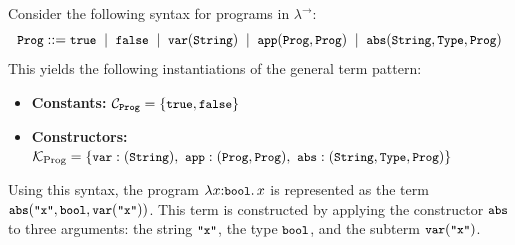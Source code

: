 \documentclass[manuscript,screen]{acmart}
\newcommand{\tcode}[1]{{\small \texttt{\spaceskip=0.2em #1}}}
\newcommand{\stlc}{\lambda^{\rightarrow}}
\begin{document}
\begin{example}
Consider the following syntax for programs in $\stlc$:
\[
\tcode{Prog} ::= 
  \tcode{true} \;\mid\;
  \tcode{false} \;\mid\;
  \tcode{var}(\tcode{String}) \;\mid\;
  \tcode{app}(\tcode{Prog}, \tcode{Prog}) \;\mid\;
  \tcode{abs}(\tcode{String}, \tcode{Type}, \tcode{Prog})
\]
This yields the following instantiations of the general term pattern:
\begin{itemize}
  \item \textbf{Constants:} \(\mathcal{C}_{\tcode{Prog}} = \{\tcode{true}, \tcode{false}\}\)
  \item \textbf{Constructors:}
    \(\mathcal{K}_{\text{Prog}} = \{
      \tcode{var} : (\tcode{String}),\ 
      \tcode{app} : (\tcode{Prog}, \tcode{Prog}),\ 
      \tcode{abs} : (\tcode{String}, \tcode{Type}, \tcode{Prog})
    \}\)
\end{itemize}
Using this syntax, the program $\lambda x{:}\tcode{bool}.\, x$ is represented as the term $\tcode{abs}(\tcode{"x"}, \tcode{bool}, \tcode{var}(\tcode{"x"}))$. This term is constructed by applying the constructor $\tcode{abs}$ to three arguments: the string $\tcode{"x"}$, the type $\tcode{bool}$, and the subterm $\tcode{var}(\tcode{"x"})$.
\end{example}
\end{document}
